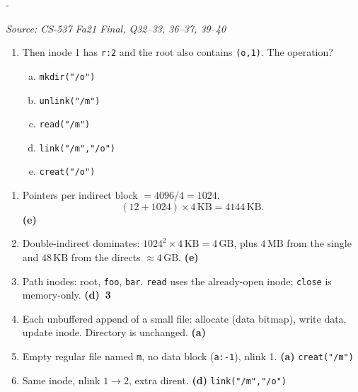\documentclass[11pt,a4paper]{article}
\makeatletter
\newcommand{\keepspace}[1]{\par\penalty-100\begingroup
  \setlength{\dimen@}{#1}\dimen@ii\pagegoal\advance\dimen@ii-\pagetotal
  \ifdim\dimen@>\dimen@ii\ifdim\dimen@ii>\z@\vfil\fi\break\fi\endgroup}
\newcounter{qn}[section]
\newenvironment{Qn}[4]{%
  \refstepcounter{qn}\keepspace{7\baselineskip}%
  \begin{tcolorbox}[qboxstyle, title={Q\thesection.\theqn\ \ [#1 \textbar\ #2]\ \ #4}]%
  {\footnotesize\color{g3}\textit{Source: #3}}\par\smallskip%
}{%
  \end{tcolorbox}%
}
\newenvironment{Sol}{%
  \begin{tcolorbox}[sboxstyle, title={Solution}]%
}{%
  \end{tcolorbox}\vspace{0.35em}%
}
\makeatother
\begin{document}
\begin{Qn}{Medium-Hard}{Lect 24}{CS-537 Fa21 Final, Q32--33, 36--37, 39--40}{VSFS size, open/append I/O, and simulator ops}
\begin{enumerate}[(32)]
      \begin{enumerate}[(a)]
      \item \texttt{creat("/m")}
      \item \texttt{mkdir("/m")}
      \item \texttt{unlink("/m")}
      \item append a block to the root directory
      \item append a block to the root inode
      \end{enumerate}
\item Then inode 1 has \texttt{r:2} and the root also contains
      \texttt{(o,1)}. The operation?
      \begin{enumerate}[(a)]
      \item \texttt{mkdir("/o")}
      \item \texttt{unlink("/m")}
      \item \texttt{read("/m")}
      \item \texttt{link("/m","/o")}
      \item \texttt{creat("/o")}
      \end{enumerate}
\end{enumerate}
\end{Qn}
\begin{Sol}
\begin{enumerate}[(32)]
\item Pointers per indirect block $=4096/4=1024$.
      \[
        (12+1024)\times 4\,\mathrm{KB} = 4144\,\mathrm{KB}.
      \]
      \textbf{(e)}
\item Double-indirect dominates:
      $1024^{2}\times 4\,\mathrm{KB} = 4\,\mathrm{GB}$, plus $4\,\mathrm{MB}$
      from the single and $48\,\mathrm{KB}$ from the directs
      $\approx 4\,\mathrm{GB}$. \textbf{(e)}
\item Path inodes: root, \texttt{foo}, \texttt{bar}. \texttt{read} uses
      the already-open inode; \texttt{close} is memory-only. \textbf{(d)~3}
\item Each unbuffered append of a small file: allocate (data bitmap),
      write data, update inode. Directory is unchanged. \textbf{(a)}
\item Empty regular file named \texttt{m}, no data block
      (\texttt{a:-1}), nlink 1. \textbf{(a)} \texttt{creat("/m")}
\item Same inode, nlink $1\to 2$, extra dirent. \textbf{(d)}
      \texttt{link("/m","/o")}
\end{enumerate}
\end{Sol}
\end{document}
